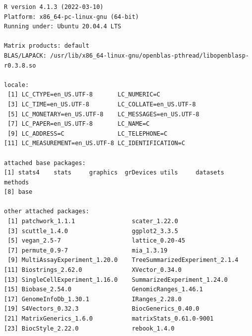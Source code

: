 \documentclass[
]{book}
\begin{document}
\begin{verbatim}
R version 4.1.3 (2022-03-10)
Platform: x86_64-pc-linux-gnu (64-bit)
Running under: Ubuntu 20.04.4 LTS

Matrix products: default
BLAS/LAPACK: /usr/lib/x86_64-linux-gnu/openblas-pthread/libopenblasp-r0.3.8.so

locale:
 [1] LC_CTYPE=en_US.UTF-8       LC_NUMERIC=C              
 [3] LC_TIME=en_US.UTF-8        LC_COLLATE=en_US.UTF-8    
 [5] LC_MONETARY=en_US.UTF-8    LC_MESSAGES=en_US.UTF-8   
 [7] LC_PAPER=en_US.UTF-8       LC_NAME=C                 
 [9] LC_ADDRESS=C               LC_TELEPHONE=C            
[11] LC_MEASUREMENT=en_US.UTF-8 LC_IDENTIFICATION=C       

attached base packages:
[1] stats4    stats     graphics  grDevices utils     datasets  methods  
[8] base     

other attached packages:
 [1] patchwork_1.1.1                scater_1.22.0                 
 [3] scuttle_1.4.0                  ggplot2_3.3.5                 
 [5] vegan_2.5-7                    lattice_0.20-45               
 [7] permute_0.9-7                  mia_1.3.19                    
 [9] MultiAssayExperiment_1.20.0    TreeSummarizedExperiment_2.1.4
[11] Biostrings_2.62.0              XVector_0.34.0                
[13] SingleCellExperiment_1.16.0    SummarizedExperiment_1.24.0   
[15] Biobase_2.54.0                 GenomicRanges_1.46.1          
[17] GenomeInfoDb_1.30.1            IRanges_2.28.0                
[19] S4Vectors_0.32.3               BiocGenerics_0.40.0           
[21] MatrixGenerics_1.6.0           matrixStats_0.61.0-9001       
[23] BiocStyle_2.22.0               rebook_1.4.0                  


\end{verbatim}
\end{document}
